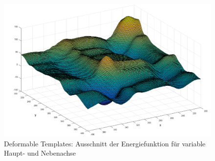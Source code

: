 \begin{figure}[!htb]
	\centering
	\includegraphics[scale=.4]{images/deformable.png}
	\caption{Deformable Templates: Ausschnitt der Energiefunktion für variable Haupt- und Nebenachse}
	\label{fig:deformable}
\end{figure}













